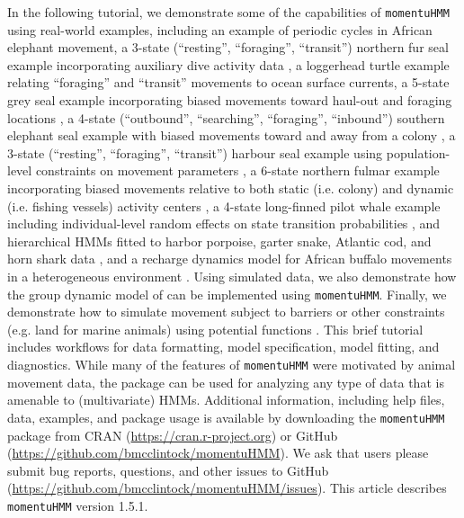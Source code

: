 \documentclass[12pt]{article}\usepackage[]{graphicx}\usepackage[]{color}
\begin{document}
In the following tutorial, we demonstrate some of the capabilities of \verb|momentuHMM| using real-world examples, including an example of periodic cycles in African elephant movement, a 3-state (``resting'', ``foraging'', ``transit'') northern fur seal example incorporating auxiliary dive activity data \citep{McClintockEtAl2014b}, a loggerhead turtle example relating ``foraging'' and ``transit'' movements to ocean surface currents, a 5-state grey seal example incorporating biased movements toward haul-out and foraging locations \citep{McClintockEtAl2012}, a 4-state (``outbound'', ``searching'', ``foraging'', ``inbound'') southern elephant seal example with biased movements toward and away from a colony \citep{MichelotEtAl2017}, a 3-state (``resting'', ``foraging'', ``transit'') harbour seal example using population-level constraints on movement parameters \citep{McClintockEtAl2013c}, a 6-state northern fulmar example incorporating biased movements relative to both static (i.e. colony) and dynamic (i.e. fishing vessels) activity centers \citep{PirottaEtAl2018}, a 4-state long-finned pilot whale example including individual-level random effects on state transition probabilities \citep{IsojunnoEtAl2017}, and hierarchical HMMs fitted to harbor porpoise, garter snake, Atlantic cod, and horn shark data \citep{Leos-BarajasEtAl2017,AdamEtAl2019}, and a recharge dynamics model for African buffalo movements in a heterogeneous environment \citep{HootenEtAl2019}. Using simulated data, we also demonstrate how the group dynamic model of \cite{LangrockEtAl2014} can be implemented using \verb|momentuHMM|. Finally, we demonstrate how to simulate movement subject to barriers or other constraints (e.g. land for marine animals) using potential functions \citep[e.g.][]{BrillingerEtAl2012}. This brief tutorial includes workflows for data formatting, model specification, model fitting, and diagnostics. While many of the features of \verb|momentuHMM| were motivated by animal movement data, the package can be used for analyzing any type of data that is amenable to (multivariate) HMMs.  Additional information, including help files, data, examples, and package usage is available by downloading the \verb|momentuHMM| package from CRAN (\url{https://cran.r-project.org}) or GitHub (\url{https://github.com/bmcclintock/momentuHMM}). We ask that users please submit bug reports, questions, and other issues to GitHub (\url{https://github.com/bmcclintock/momentuHMM/issues}). This article describes \verb|momentuHMM| version 1.5.1.
\end{document}
